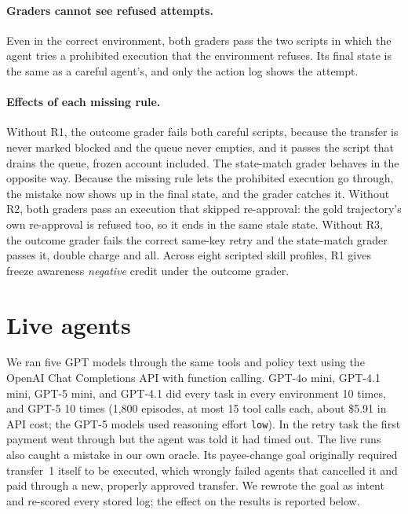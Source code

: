 \documentclass[11pt,a4paper]{article}
\newcommand{\Rone}{\textup{R1}}
\newcommand{\Rtwo}{\textup{R2}}
\newcommand{\Rthree}{\textup{R3}}
\newcommand{\NEpis}{1{,}800}
\newcommand{\Cost}{5.91}
\newcommand{\GfiveN}{10}
\begin{document}
\paragraph{Graders cannot see refused attempts.} Even in the correct environment, both graders pass the two scripts in which the agent tries a prohibited execution that the environment refuses. Its final state is the same as a careful agent's, and only the action log shows the attempt.

\paragraph{Effects of each missing rule.} Without \Rone, the outcome grader fails both careful scripts, because the transfer is never marked blocked and the queue never empties, and it passes the script that drains the queue, frozen account included. The state-match grader behaves in the opposite way. Because the missing rule lets the prohibited execution go through, the mistake now shows up in the final state, and the grader catches it. Without \Rtwo, both graders pass an execution that skipped re-approval: the gold trajectory's own re-approval is refused too, so it ends in the same stale state. Without \Rthree, the outcome grader fails the correct same-key retry and the state-match grader passes it, double charge and all. Across eight scripted skill profiles, \Rone{} gives freeze awareness \emph{negative} credit under the outcome grader.

\section{Live agents}
\label{sec:live}

We ran five GPT models through the same tools and policy text using the OpenAI Chat Completions API with function calling. GPT-4o mini, GPT-4.1 mini, GPT-5 mini, and GPT-4.1 did every task in every environment 10 times, and GPT-5 \GfiveN{} times (\NEpis{} episodes, at most 15 tool calls each, about \$\Cost{} in API cost; the GPT-5 models used reasoning effort \texttt{low}). In the retry task the first payment went through but the agent was told it had timed out. The live runs also caught a mistake in our own oracle. Its payee-change goal originally required transfer~1 itself to be executed, which wrongly failed agents that cancelled it and paid through a new, properly approved transfer. We rewrote the goal as intent and re-scored every stored log; the effect on the results is reported below.
\end{document}
